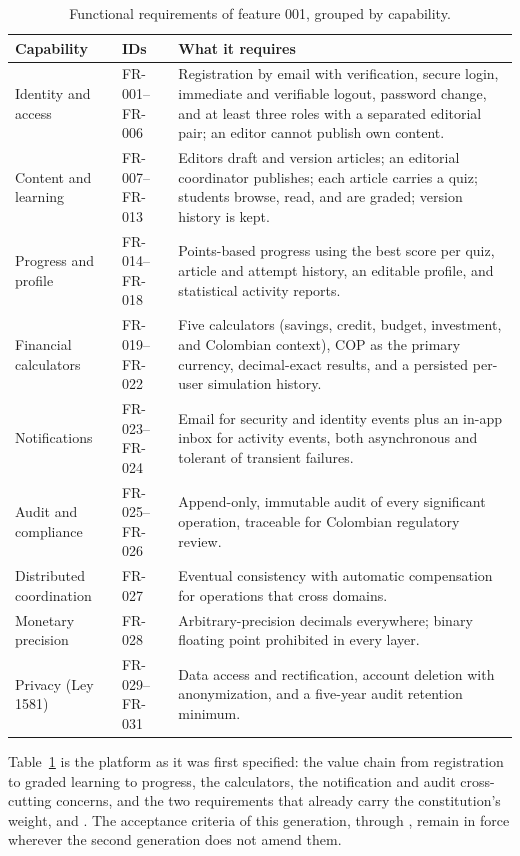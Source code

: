 \begin{table}[htbp]
  \centering
  \caption{Functional requirements of feature 001, grouped by capability.}
  \label{tab:fr-001}
  \begin{tabular}{@{}p{3.6cm}p{3.4cm}p{9.4cm}@{}}
    \hline
    Capability & IDs & What it requires \\
    \hline
    Identity and access & FR-001--FR-006 & Registration by email with verification, secure
    login, immediate and verifiable logout, password change, and at least three roles with a
    separated editorial pair; an editor cannot publish own content. \\
    Content and learning & FR-007--FR-013 & Editors draft and version articles; an editorial
    coordinator publishes; each article carries a quiz; students browse, read, and are graded;
    version history is kept. \\
    Progress and profile & FR-014--FR-018 & Points-based progress using the best score per quiz,
    article and attempt history, an editable profile, and statistical activity reports. \\
    Financial calculators & FR-019--FR-022 & Five calculators (savings, credit, budget,
    investment, and Colombian context), COP as the primary currency, decimal-exact results, and a
    persisted per-user simulation history. \\
    Notifications & FR-023--FR-024 & Email for security and identity events plus an in-app inbox
    for activity events, both asynchronous and tolerant of transient failures. \\
    Audit and compliance & FR-025--FR-026 & Append-only, immutable audit of every significant
    operation, traceable for Colombian regulatory review. \\
    Distributed coordination & FR-027 & Eventual consistency with automatic compensation for
    operations that cross domains. \\
    Monetary precision & FR-028 & Arbitrary-precision decimals everywhere; binary floating point
    prohibited in every layer. \\
    Privacy (Ley 1581) & FR-029--FR-031 & Data access and rectification, account deletion with
    anonymization, and a five-year audit retention minimum. \\
    \hline
  \end{tabular}
\end{table}

Table~\ref{tab:fr-001} is the platform as it was first specified: the value chain from
registration to graded learning to progress, the calculators, the notification and audit
cross-cutting concerns, and the two requirements that already carry the constitution's weight,
 and . The acceptance criteria of this generation,  through
, remain in force wherever the second generation does not amend them.

